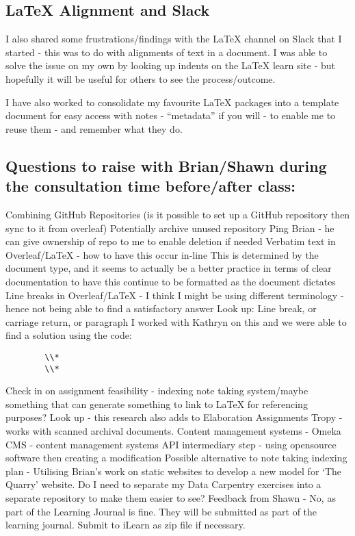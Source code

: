 \documentclass{article}
\begin{document}
\subsection{LaTeX Alignment and Slack}
\label{ Error: LaTeX Alignment}
I also shared some frustrations/findings with the LaTeX channel on Slack that I started - this was to do with alignments of text in a document. I was able to solve the issue on my own by looking up indents on the LaTeX learn site - but hopefully it will be useful for others to see the process/outcome.

I have also worked to consolidate my favourite LaTeX packages into a template document for easy access with notes - ``metadata'' if you will - to enable me to reuse them - and remember what they do. 

\subsection{Questions to raise with Brian/Shawn during the consultation time before/after class:}
\label{ Error: GitHub Troubleshooting - Redundant Repository}
\begin{outline}[enumerate]
    \1 Combining GitHub Repositories (is it possible to set up a GitHub repository then sync to it from overleaf)
        \2 Potentially archive unused repository
        \2 Ping Brian - he can give ownership of repo to me to enable deletion if needed
    \1 Verbatim text in Overleaf/LaTeX - how to have this occur in-line
        \2 This is determined by the document type, and it seems to actually be a better practice in terms of clear documentation to have this continue to be formatted as the document dictates
    \1 Line breaks in Overleaf/LaTeX - I think I might be using different terminology - hence not being able to find a satisfactory answer
        \2 Look up:
            \3 Line break, or carriage return, or paragraph
            \3 I worked with Kathryn on this and we were able to find a solution using the code:
    \begin{verbatim}
        \\*
        \\*
    \end{verbatim}
    \1 Check in on assignment feasibility - indexing note taking system/maybe something that can generate something to link to LaTeX for referencing purposes?
        \2 Look up - this research also adds to Elaboration Assignments
            \3 Tropy - works with scanned archival documents. 
            \3 Content management systems - Omeka
            \3 CMS - content management systems
            \3 API intermediary step - using opensource software then creating a modification
            \3 Possible alternative to note taking indexing plan - Utilising Brian's work on static websites to develop a new model for `The Quarry' website.
    \1 Do I need to separate my Data Carpentry exercises into a separate repository to make them easier to see?
        \2 Feedback from Shawn - No, as part of the Learning Journal is fine. They will be submitted as part of the learning journal. Submit to iLearn as zip file if necessary.
\end{outline}
    
\end{document}
